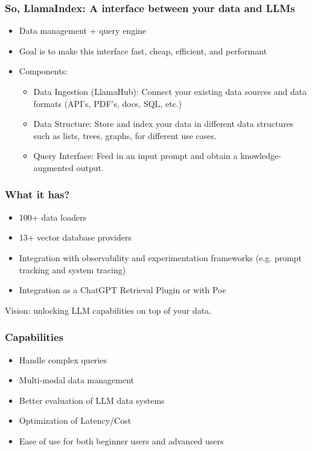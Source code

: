 \begin{frame}[fragile]\frametitle{So, LlamaIndex: A interface between your data and LLMs }


\begin{itemize}
\item Data management + query engine
\item Goal is to make this interface fast, cheap, efficient, and performant 
\item Components:
	\begin{itemize}
	\item Data Ingestion (LlamaHub): Connect your existing data sources and data formats (API’s, PDF’s, docs, SQL, etc.)
	\item Data Structure: Store and index your data in different data structures such as lists, trees, graphs, for different use cases. 
	\item Query Interface: Feed in an input prompt and obtain a knowledge-augmented output.
	\end{itemize}	

\end{itemize}	
\end{frame}

\begin{frame}[fragile]\frametitle{What it has?}


\begin{itemize}
\item 100+ data loaders
\item 13+ vector database providers
\item Integration with observability and experimentation frameworks (e.g. prompt tracking and system tracing)
\item Integration as a ChatGPT Retrieval Plugin or with Poe
\end{itemize}	

Vision: unlocking LLM capabilities on top of your data.
\end{frame}

\begin{frame}[fragile]\frametitle{Capabilities}


\begin{itemize}
\item Handle complex queries
\item Multi-modal data management
\item Better evaluation of LLM data systems
\item Optimization of Latency/Cost
\item Ease of use for both beginner users and advanced users
\end{itemize}	

\end{frame}

